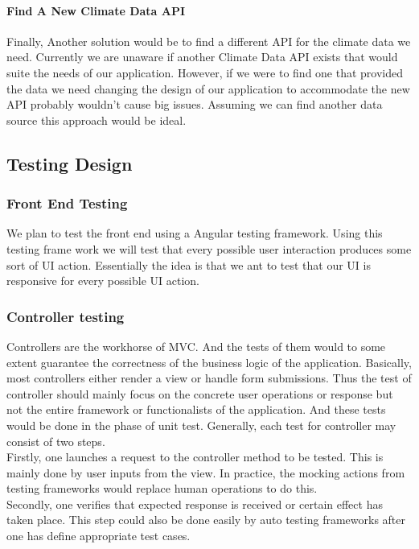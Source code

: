 \documentclass[onecolumn, draftclsnofoot,10pt, compsoc]{article}
\begin{document}
				\paragraph{\textbf{Find A New Climate Data API}} \hfill \break
				Finally, Another solution would be to find a different API for the climate data we need. Currently we are unaware if another Climate Data API exists that would suite the needs of our application. However, if we were to find one that provided the data we need changing the design of our application to accommodate the new API probably wouldn't cause big issues. Assuming we can find another data source this approach would be ideal.\\






	\subsection{Testing Design}
		\subsubsection{Front End Testing}
		We plan to test the front end using a Angular testing framework. Using this testing frame work we will test that every possible user interaction produces some sort of UI action. Essentially the idea is that we ant to test that our UI is responsive for every possible UI action.\\
		
		\subsubsection{Controller testing}
		Controllers are the workhorse of MVC. And the tests of them would to some extent guarantee the correctness of the business logic of the application. Basically, most controllers either render a view or handle form submissions. Thus the test of controller should mainly focus on the concrete user operations or response but not the entire framework or functionalists of the application. And these tests would be done in the phase of unit test. Generally, each test for controller may consist of two steps. \\
		Firstly, one launches a request to the controller method to be tested. This is mainly done by user inputs from the view. In practice, the mocking actions from testing frameworks would replace human operations to do this.\\
		Secondly, one verifies that expected response is received or certain effect has taken place. This step could also be done easily by auto testing frameworks after one has define appropriate test cases.\\
\end{document}
